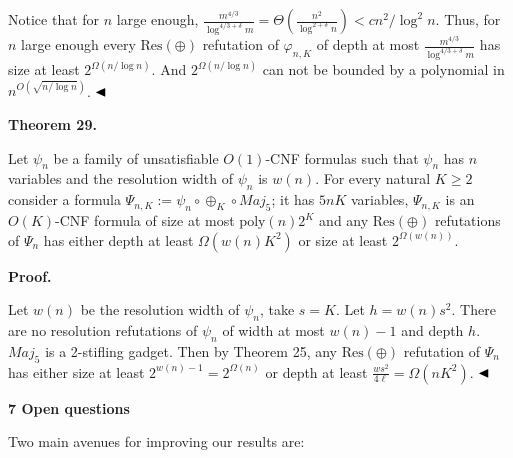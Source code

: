 \documentclass[10pt,a4paper]{article}
\begin{document}
Notice that for $n$ large enough,
$\frac{m^{4/3}}{\log^{4/3+\delta}m}=\Theta\left(\frac{n^{2}}{\log^{2+\delta}n}\right)<cn^{2}/\log^{2}n$. Thus, for $n$ large enough every $\mathrm{Res}(\oplus)$ refutation of $\varphi_{n,K}$ of depth at most $\frac{m^{4/3}}{\log^{4/3+\delta}m}$ has size at least $2^{\Omega(n/\log n)}$. And $2^{\Omega(n/\log n)}$ can not be bounded by a polynomial in $n^{O\left(\sqrt{n/\log n}\right)}$.
$\hfill\blacktriangleleft$\par



\par\medskip\noindent\textbf{
Theorem 29.
}\par



Let $\psi_{n}$ be a family of unsatisfiable $O(1)$-CNF formulas such that $\psi_{n}$ has $n$ variables and the resolution width
of $\psi_{n}$ is $w(n)$.
For every natural $K\geq 2$ consider a formula $\Psi_{n,K}:=\psi_{n}\circ\oplus_{K}\circ Maj_{5}$;
it has $5nK$ variables, $\Psi_{n,K}$ is an $O(K)$-CNF formula of size at most $\mathrm{poly}(n)2^{K}$ and any $\mathrm{Res}(\oplus)$
refutations of $\Psi_{n}$ has either depth at least $\Omega(w(n)K^{2})$ or size at least $2^{\Omega(w(n))}$.\par



\par\medskip\noindent\textbf{Proof.}\par


Let $w(n)$ be the resolution width of $\psi_{n}$, take $s=K$. Let $h=w(n)s^{2}$.
There are no resolution refutations of $\psi_{n}$ of width at most $w(n)-1$ and depth $h$. $Maj_{5}$ is a 2-stifling gadget.
Then by Theorem 25, any $\mathrm{Res}(\oplus)$ refutation of $\Psi_{n}$ has either size at least $2^{w(n)-1}=2^{\Omega(n)}$
or depth at least $\frac{ws^{2}}{4\ell}=\Omega(nK^{2})$.
$\hfill\blacktriangleleft$\par


\par\medskip\noindent\textbf{
7 Open questions}\par


Two main avenues for improving our results are:\par
\end{document}
